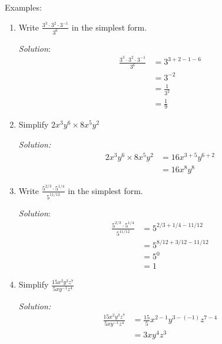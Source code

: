 \documentclass[16pt]{article}
\theoremstyle{remark}
\begin{document}
Examples:
\begin{enumerate}
\item  Write $\displaystyle{\frac{3^3 \cdot 3^2 \cdot 3^{-1}}{3^6}}$ in the simplest form.
\begin{mdframed}[style=TheoremFrame]
\textit{Solution}:
\begin{align*}
\frac{3^3 \cdot 3^2 \cdot 3^{-1}}{3^6} &= 3^{3+2-1-6}\\
&= 3^{-2}\\
&= \frac{1}{3^2}\\
&= \frac{1}{9}
\end{align*}
\end{mdframed}
\newpage
\item Simplify $\displaystyle{2x^3 y^6 \times 8x^5 y^2}$
\begin{mdframed}[style=TheoremFrame]
\textit{Solution:}
\begin{align*}
2x^3 y^6 \times 8x^5 y^2 &= 16x^{3+5} y^{6+2}\\
&= 16 x^8 y^8
\end{align*}
\end{mdframed}
\item Write $\displaystyle{\frac{5^{2/3} \cdot 5^{1/4}}{5^{11/12}}}$ in the simplest form.
\begin{mdframed}[style=TheoremFrame]
\textit{Solution}:
\begin{align*}
\frac{5^{2/3} \cdot 5^{1/4}}{5^{11/12}} &= 5^{2/3 + 1/4 - 11/12}\\
&= 5^{8/12 + 3/12 - 11/12}\\
&= 5^0\\
&=1
\end{align*}
\end{mdframed}
\item Simplify $\displaystyle{\frac{15x^2y^3z^7}{5xy^{-1}z^4}}$
\begin{mdframed}[style=TheoremFrame]
\textit{Solution:}
\begin{align*}
\frac{15x^2y^3z^7}{5xy^{-1}z^4} &= \frac{15}{5} x^{2-1} y^{3 - (-1)} z^{7-4}\\
&= 3 x y^4 z^3
\end{align*}
\end{mdframed}
\end{enumerate}
\end{document}
